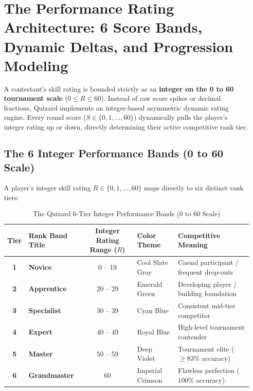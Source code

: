 \chapter{The Performance Rating Architecture: 6 Score Bands, Dynamic Deltas, and Progression Modeling}

\begin{tcolorbox}[storybox, title={The Rating Engine in Brief}]
A contestant's skill rating is bounded strictly as an \textbf{integer on the 0 to 60 tournament scale} ($0 \le R \le 60$). Instead of raw score spikes or decimal fractions, Quizard implements an integer-based asymmetric dynamic rating engine. Every round score ($S \in \{0, 1, \dots, 60\}$) dynamically pulls the player's integer rating up or down, directly determining their active competitive rank tier.
\end{tcolorbox}

\section{The 6 Integer Performance Bands (0 to 60 Scale)}
A player's integer skill rating $R \in \{0, 1, \dots, 60\}$ maps directly to six distinct rank tiers:

\begin{table}[htbp]
\centering
\footnotesize
\begin{tabular}{|c|l|c|l|p{5.2cm}|}
\hline
\rowcolor{primaryBlue!15}
\textbf{Tier} & \textbf{Rank Band Title} & \textbf{Integer Rating Range ($R$)} & \textbf{Color Theme} & \textbf{Competitive Meaning} \\ \hline
\textbf{1} & \textbf{Novice} & 0 -- 19 & Cool Slate Gray & Casual participant / frequent drop-outs \\ \hline
\textbf{2} & \textbf{Apprentice} & 20 -- 29 & Emerald Green & Developing player / building foundation \\ \hline
\textbf{3} & \textbf{Specialist} & 30 -- 39 & Cyan Blue & Consistent mid-tier competitor \\ \hline
\textbf{4} & \textbf{Expert} & 40 -- 49 & Royal Blue & High-level tournament contender \\ \hline
\textbf{5} & \textbf{Master} & 50 -- 59 & Deep Violet & Tournament elite ($\ge 83\%$ accuracy) \\ \hline
\textbf{6} & \textbf{Grandmaster} & 60 & Imperial Crimson & Flawless perfection ($100\%$ accuracy) \\ \hline
\end{tabular}
\caption{The Quizard 6-Tier Integer Performance Bands (0 to 60 Scale)}
\end{table}

